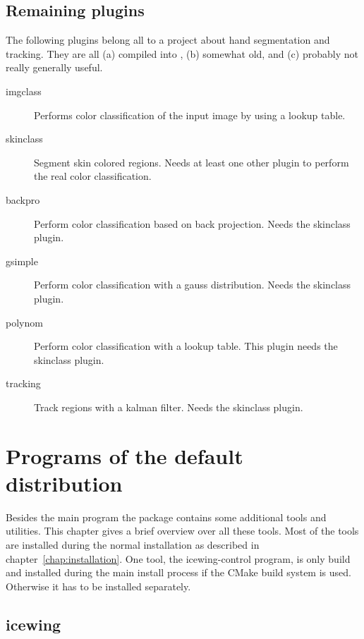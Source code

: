 \section{Remaining plugins}

The following plugins belong all to a project about hand
segmentation and tracking. They are all (a) compiled into
\icewing{}, (b) somewhat old, and (c) probably not really generally
useful.

\begin{description}
\item[imgclass]
  Performs color classification of the input image by using a lookup
  table.
\item[skinclass]
  Segment skin colored regions. Needs at least one other plugin to
  perform the real color classification.
\item[backpro]
  Perform color classification based on back projection. Needs the
  skinclass plugin.
\item[gsimple]
  Perform color classification with a gauss distribution. Needs the
  skinclass plugin.
\item[polynom]
  Perform color classification with a lookup table. This plugin
  needs the skinclass plugin.
\item[tracking]
  Track regions with a kalman filter. Needs the skinclass plugin.
\end{description}

\chapter{Programs of the default distribution}

Besides the main \icewing{} program the \icewing{} package contains
some additional tools and utilities. This chapter gives a brief
overview over all these tools. Most of the tools are installed
during the normal installation as described in
chapter~\ref{chap:installation}. One tool, the icewing-control
program, is only build and installed during the main install process
if the CMake build system is used. Otherwise it has to be installed
separately.

\section{icewing}

